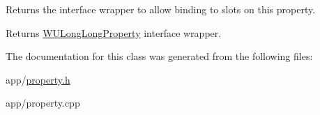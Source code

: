Returns the interface wrapper to allow binding to slots on this property. 

\begin{DoxyReturn}{Returns}
\hyperlink{class_w_u_long_long_property}{W\-U\-Long\-Long\-Property} interface wrapper. 
\end{DoxyReturn}


The documentation for this class was generated from the following files\-:\begin{DoxyCompactItemize}
\item 
app/\hyperlink{property_8h}{property.\-h}\item 
app/property.\-cpp\end{DoxyCompactItemize}
